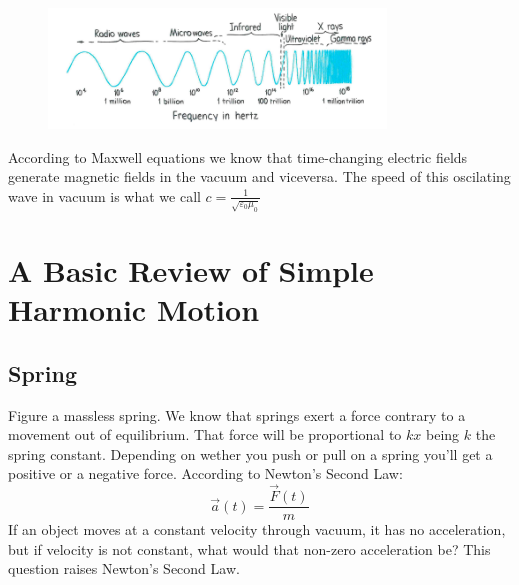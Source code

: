 \documentclass{report}
\begin{document}
  \begin{figure}[h]
    \centering
    \includegraphics[width=0.8\textwidth]{fotos/visible_spectrum.png}
  \end{figure}

  \noindent According to Maxwell equations we know that time-changing electric fields generate magnetic fields in the vacuum and viceversa. The speed of this oscilating wave in vacuum is what we call $c=\frac{1}{\sqrt{\varepsilon_0\mu_0}}$
  \clearpage

  \section{A Basic Review of Simple Harmonic Motion}
    \subsection{Spring}
      \noindent Figure a massless spring. We know that springs exert a force contrary to a movement out of equilibrium. That force will be proportional to $kx$ being $k$ the spring constant. Depending on wether you push or pull on a spring you'll get a positive or a negative force. According to Newton's Second Law:
      \begin{equation}
        \vec{a}(t)=\dfrac{\vec{F}(t)}{m}
      \end{equation}
      \noindent If an object moves at a constant velocity through vacuum, it has no acceleration, but if velocity is not constant, what would that non-zero acceleration be? This question raises Newton's Second Law.\\
\end{document}
